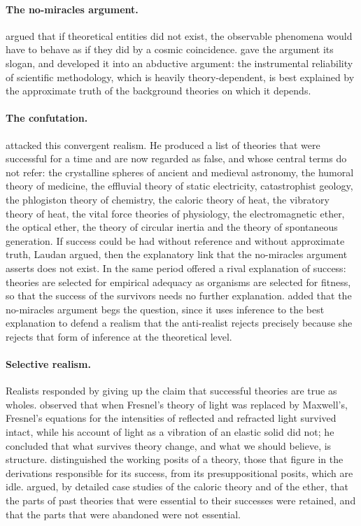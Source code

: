 \documentclass{situationist-preprint}
\begin{document}
\paragraph{The no-miracles argument.} \citet{Smart1963} argued that if theoretical entities did not exist, the observable phenomena would have to behave as if they did by a cosmic coincidence. \citet{Putnam1975} gave the argument its slogan, and \citet{Boyd1983} developed it into an abductive argument: the instrumental reliability of scientific methodology, which is heavily theory-dependent, is best explained by the approximate truth of the background theories on which it depends.

\paragraph{The confutation.} \citet{Laudan1981} attacked this convergent realism. He produced a list of theories that were successful for a time and are now regarded as false, and whose central terms do not refer: the crystalline spheres of ancient and medieval astronomy, the humoral theory of medicine, the effluvial theory of static electricity, catastrophist geology, the phlogiston theory of chemistry, the caloric theory of heat, the vibratory theory of heat, the vital force theories of physiology, the electromagnetic ether, the optical ether, the theory of circular inertia and the theory of spontaneous generation. If success could be had without reference and without approximate truth, Laudan argued, then the explanatory link that the no-miracles argument asserts does not exist. In the same period \citet{vanFraassen1980} offered a rival explanation of success: theories are selected for empirical adequacy as organisms are selected for fitness, so that the success of the survivors needs no further explanation. \citet{Fine1984} added that the no-miracles argument begs the question, since it uses inference to the best explanation to defend a realism that the anti-realist rejects precisely because she rejects that form of inference at the theoretical level.

\paragraph{Selective realism.} Realists responded by giving up the claim that successful theories are true as wholes. \citet{Worrall1989} observed that when Fresnel's theory of light was replaced by Maxwell's, Fresnel's equations for the intensities of reflected and refracted light survived intact, while his account of light as a vibration of an elastic solid did not; he concluded that what survives theory change, and what we should believe, is structure. \citet{Kitcher1993} distinguished the working posits of a theory, those that figure in the derivations responsible for its success, from its presuppositional posits, which are idle. \citet{Psillos1999} argued, by detailed case studies of the caloric theory and of the ether, that the parts of past theories that were essential to their successes were retained, and that the parts that were abandoned were not essential.
\end{document}
